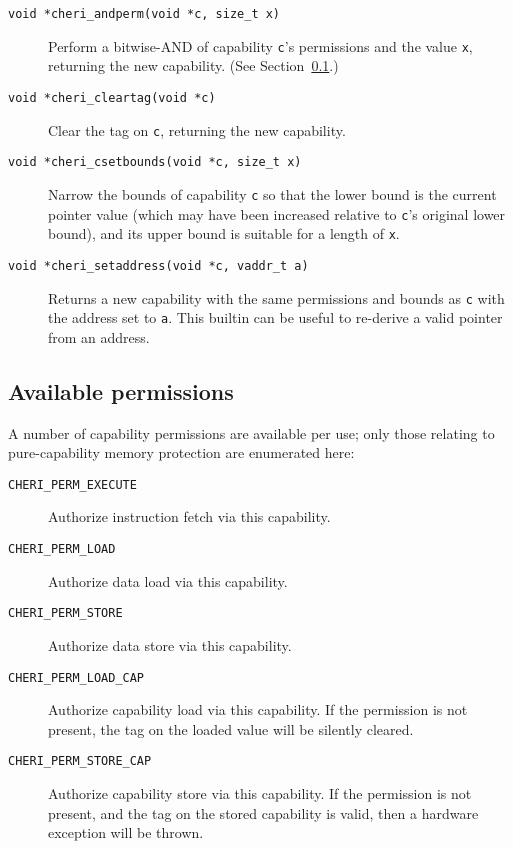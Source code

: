 \documentclass[11pt]{article}
\newcommand{\note}[2]{{\color{blue}[ Note: #1 - #2]}}
\renewcommand{\note}[2]{}
\begin{document}
\begin{description}
\item[\texttt{void *cheri\_andperm(void *c, size\_t x)}] Perform a bitwise-AND of capability
  \texttt{c}'s permissions and the value \texttt{x}, returning the new
  capability.
  (See Section~\ref{sec:available_permissions}.)

\item[\texttt{void *cheri\_cleartag(void *c)}] Clear the tag on \texttt{c}, returning the
  new capability.

\item[\texttt{void *cheri\_csetbounds(void *c, size\_t x)}] Narrow the bounds of capability
  \texttt{c} so that the lower bound is the current pointer value (which may
  have been increased relative to \texttt{c}'s original lower bound), and its
  upper bound is suitable for a length of \texttt{x}.

\item[\texttt{void *cheri\_setaddress(void *c, vaddr\_t a)}] Returns a new capability with the same permissions and bounds as \texttt{c} with the address set to \texttt{a}.
This builtin can be useful to re-derive a valid pointer from an address.
\end{description}


\subsection{Available permissions}
\label{sec:available_permissions}

A number of capability permissions are available per use; only those relating
to pure-capability memory protection are enumerated here:

\begin{description}
\item[\texttt{CHERI\_PERM\_EXECUTE}] Authorize instruction fetch via this
   capability.

\item[\texttt{CHERI\_PERM\_LOAD}] Authorize data load via this capability.

\item[\texttt{CHERI\_PERM\_STORE}] Authorize data store via this capability.

\item[\texttt{CHERI\_PERM\_LOAD\_CAP}] Authorize capability load via this
  capability.
  If the permission is not present, the tag on the loaded value
  will be silently cleared.

\item[\texttt{CHERI\_PERM\_STORE\_CAP}] Authorize capability store via this
  capability.
  If the permission is not present, and the tag on the stored capability is
  valid, then a hardware exception will be thrown.
\end{description}
\end{document}
